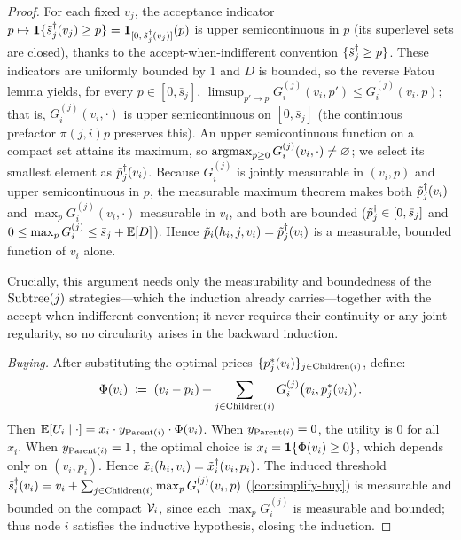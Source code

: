 \begin{proof}
For each fixed $v_j$, the acceptance indicator $p \mapsto \bm{1}\{\tilde{s}^\dagger_j(v_j) \ge p\} = \bm{1}_{[0,\, \tilde{s}^\dagger_j(v_j)]}(p)$ is upper semicontinuous in $p$ (its superlevel sets are closed), thanks to the accept-when-indifferent convention $\{\tilde{s}^\dagger_j \ge p\}$. These indicators are uniformly bounded by $1$ and $D$ is bounded, so the reverse Fatou lemma yields, for every $p \in [0, \bar s_j]$, $\limsup_{p' \to p} G^{(j)}_i(v_i, p') \le G^{(j)}_i(v_i, p)$; that is, $G^{(j)}_i(v_i, \cdot)$ is upper semicontinuous on $[0,\bar s_j]$ (the continuous prefactor $\pi(j,i)p$ preserves this). An upper semicontinuous function on a compact set attains its maximum, so $\operatorname*{argmax}_{p \ge 0} G^{(j)}_i(v_i, \cdot) \neq \varnothing$; we select its smallest element as $\tilde{p}^\dagger_j(v_i)$. Because $G^{(j)}_i$ is jointly measurable in $(v_i,p)$ and upper semicontinuous in $p$, the measurable maximum theorem makes both $\tilde{p}^\dagger_j(v_i)$ and $\max_p G^{(j)}_i(v_i,\cdot)$ measurable in $v_i$, and both are bounded ($\tilde{p}^\dagger_j \in [0,\bar s_j]$ and $0 \le \max_p G^{(j)}_i \le \bar s_j + \mathbb{E}[D]$). Hence $\tilde{p}_i(h_i, j, v_i) = \tilde{p}^\dagger_j(v_i)$ is a measurable, bounded function of $v_i$ alone.

Crucially, this argument needs only the measurability and boundedness of the $\operatorname{Subtree}(j)$ strategies---which the induction already carries---together with the accept-when-indifferent convention; it never requires their continuity or any joint regularity, so no circularity arises in the backward induction.

\emph{Buying.} After substituting the optimal prices $\{p^*_j(v_i)\}_{j \in \operatorname{Children}(i)}$, define:
\[
\Phi(v_i) \;\coloneqq\; (v_i - p_i) + \sum_{j \in \operatorname{Children}(i)} G^{(j)}_i\big(v_i, p^*_j(v_i)\big).
\]
Then $\mathbb{E}[U_i \mid \cdot] = x_i \cdot y_{\operatorname{Parent}(i)} \cdot \Phi(v_i)$. When $y_{\operatorname{Parent}(i)} = 0$, the utility is $0$ for all $x_i$. When $y_{\operatorname{Parent}(i)} = 1$, the optimal choice is $x_i = \bm{1}\{\Phi(v_i) \ge 0\}$, which depends only on $(v_i, p_i)$. Hence $\tilde{x}_i(h_i, v_i) = \tilde{x}^\dagger_i(v_i, p_i)$. The induced threshold $\tilde{s}^\dagger_i(v_i) = v_i + \sum_{j \in \operatorname{Children}(i)} \max_{p} G^{(j)}_i(v_i, p)$ (\cref{cor:simplify-buy}) is measurable and bounded on the compact $\mathcal{V}_i$, since each $\max_p G^{(j)}_i$ is measurable and bounded; thus node $i$ satisfies the inductive hypothesis, closing the induction.


\end{proof}
